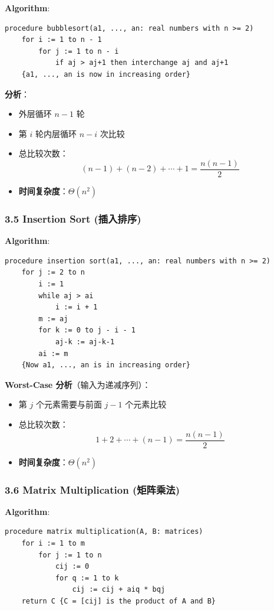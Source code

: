 \documentclass[10pt,a4paper,openany]{ctexbook}
\theoremstyle{definition}
\theoremstyle{remark}
\begin{document}
\textbf{Algorithm}:
{\footnotesize\begin{verbatim}
procedure bubblesort(a1, ..., an: real numbers with n >= 2)
    for i := 1 to n - 1
        for j := 1 to n - i
            if aj > aj+1 then interchange aj and aj+1
    {a1, ..., an is now in increasing order}
\end{verbatim}}

\textbf{分析}：
\begin{itemize}
\item 外层循环 $n-1$ 轮
\item 第 $i$ 轮内层循环 $n-i$ 次比较
\item 总比较次数：
\[
(n-1) + (n-2) + \cdots + 1 = \frac{n(n-1)}{2}
\]

\item \textbf{时间复杂度}：$\Theta(n^2)$

\end{itemize}

\subsubsection{3.5 Insertion Sort (插入排序)}

\textbf{Algorithm}:
{\footnotesize\begin{verbatim}
procedure insertion sort(a1, ..., an: real numbers with n >= 2)
    for j := 2 to n
        i := 1
        while aj > ai
            i := i + 1
        m := aj
        for k := 0 to j - i - 1
            aj-k := aj-k-1
        ai := m
    {Now a1, ..., an is in increasing order}
\end{verbatim}}

\textbf{Worst-Case 分析}（输入为递减序列）：
\begin{itemize}
\item 第 $j$ 个元素需要与前面 $j-1$ 个元素比较
\item 总比较次数：
\[
1 + 2 + \cdots + (n-1) = \frac{n(n-1)}{2}
\]

\item \textbf{时间复杂度}：$\Theta(n^2)$

\end{itemize}

\subsubsection{3.6 Matrix Multiplication (矩阵乘法)}

\textbf{Algorithm}:
{\footnotesize\begin{verbatim}
procedure matrix multiplication(A, B: matrices)
    for i := 1 to m
        for j := 1 to n
            cij := 0
            for q := 1 to k
                cij := cij + aiq * bqj
    return C {C = [cij] is the product of A and B}
\end{verbatim}}
\end{document}
